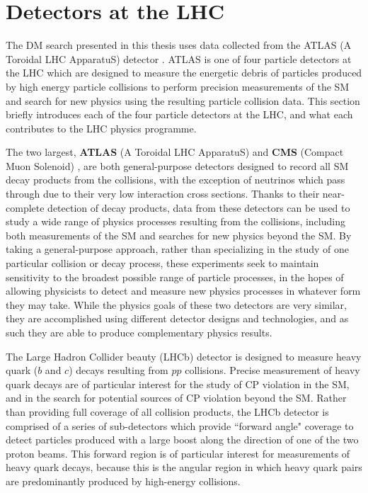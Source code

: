 \section{Detectors at the LHC}

The DM search presented in this thesis uses data collected from the ATLAS (A Toroidal LHC ApparatuS) detector \cite{atlas}. ATLAS is one of four particle detectors at the LHC which are designed to measure the energetic debris of particles produced by high energy particle collisions to perform precision measurements of the SM and search for new physics using the resulting particle collision data. This section briefly introduces each of the four particle detectors at the LHC, and what each contributes to the LHC physics programme.

The two largest, \textbf{ATLAS} (A Toroidal LHC ApparatuS) \cite{atlas} and \textbf{CMS} (Compact Muon Solenoid) \cite{cms}, are both general-purpose detectors designed to record all SM decay products from the collisions, with the exception of neutrinos which pass through due to their very low interaction cross sections. Thanks to their near-complete detection of decay products, data from these detectors can be used to study a wide range of physics processes resulting from the collisions, including both measurements of the SM and searches for new physics beyond the SM. By taking a general-purpose approach, rather than specializing in the study of one particular collision or decay process, these experiments seek to maintain sensitivity to the broadest possible range of particle processes, in the hopes of allowing physicists to detect and measure new physics processes in whatever form they may take. While the physics goals of these two detectors are very similar, they are accomplished using different detector designs and technologies, and as such they are able to produce complementary physics results.

The Large Hadron Collider beauty (LHCb) detector \cite{LHCb} is designed to measure heavy quark ($b$ and $c$) decays resulting from $pp$ collisions. Precise measurement of heavy quark decays are of particular interest for the study of CP violation in the SM, and in the search for potential sources of CP violation beyond the SM. Rather than providing full coverage of all collision products, the LHCb detector is comprised of a series of sub-detectors which provide ``forward angle" coverage to detect particles produced with a large boost along the direction of one of the two proton beams. This forward region is of particular interest for measurements of heavy quark decays, because this is the angular region in which heavy quark pairs are predominantly produced by high-energy collisions.


